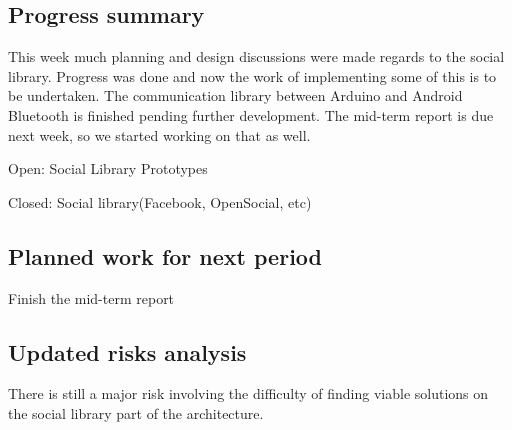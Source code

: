 \subsection{Progress summary}
This week much planning and design discussions were made regards to the social library. Progress was done 
and now the work of implementing some of this is to be undertaken. The communication library 
between Arduino and Android Bluetooth is finished pending further development. The mid-term report is 
due next week, so we started working on that as well.

Open:
Social Library
Prototypes

Closed:
Social library(Facebook, OpenSocial, etc)


\subsection{Planned work for next period}
Finish the mid-term report


\subsection{Updated risks analysis}
There is still a major risk involving the difficulty of finding viable solutions on the social library part of the architecture.